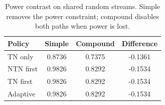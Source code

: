 \begin{table}[t]
\centering
\caption{Power contrast on shared random streams. Simple removes the power constraint; compound disables both paths when power is lost.}
\label{tab:compound}
\par\smallskip
\footnotesize
\begin{tabular}{lccc}\toprule
Policy & Simple & Compound & Difference \\ \midrule
TN only & 0.8736 & 0.7375 & -0.1361 \\
NTN first & 0.9826 & 0.8292 & -0.1534 \\
TN first & 0.9826 & 0.8292 & -0.1534 \\
Adaptive & 0.9826 & 0.8292 & -0.1534 \\
\bottomrule\end{tabular}
\end{table}
